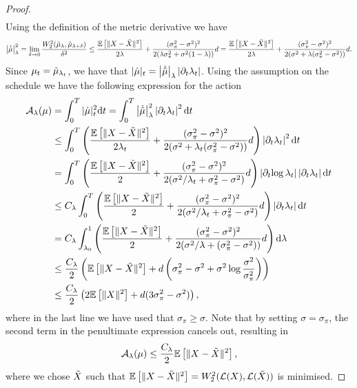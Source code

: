 \begin{proof}
\begin{align*}
\end{align*}
Using the definition of the metric derivative we have
\begin{equation*}
    \left\vert\Dot{\Tilde{\mu}}\right\vert_\lambda^2 = \lim_{\delta\to 0}\frac{ W_2^2(\Tilde{\mu}_\lambda, \Tilde{\mu}_{\lambda+\delta})}{\delta^2}\leq \frac{\mathbb{E}\left[\Vert X-\Tilde{X}\Vert^2\right]}{2 \lambda} + \frac{(\sigma_\pi^2-\sigma^2)^2}{2(\lambda\sigma_\pi^2 + \sigma^2(1-\lambda))}d = \frac{\mathbb{E}\left[\Vert X-\Tilde{X}\Vert^2\right]}{2 \lambda} + \frac{(\sigma_\pi^2-\sigma^2)^2}{2(\sigma^2 + \lambda(\sigma_{\pi}^2-\sigma^2))}d.
\end{equation*}
Since $\mu_t = \Tilde{\mu}_{\lambda_t}$, we have that $\vert\Dot{\mu}\vert_t = \left\vert\Dot{\Tilde{\mu}}\right\vert_\lambda\left\vert\partial_t{\lambda_t}\right\vert$. Using the assumption on the schedule we have the following expression for the action
\begin{align}
    \mathcal{A}_{\lambda}(\mu) &= \int_0^T \vert\Dot{\mu}\vert_t^2 \mathrm{d} t = \int_0^T \left\vert\Dot{\Tilde{\mu}}\right\vert_\lambda^2\left\vert\partial_t{\lambda_t}\right\vert^2 \mathrm{d} t\nonumber\\
    &\leq \int_0^T \left(\frac{\mathbb{E}\left[\Vert X-\Tilde{X}\Vert^2\right]}{2 \lambda_t} + \frac{(\sigma_\pi^2-\sigma^2)^2}{2(\sigma^2 + \lambda_t(\sigma_{\pi}^2-\sigma^2))}d\right)\left\vert \partial_t{\lambda_t}\right\vert^2\mathrm{d} t \nonumber\\
    &= \int_0^T \left(\frac{\mathbb{E}\left[\Vert X-\Tilde{X}\Vert^2\right]}{2} + \frac{(\sigma_\pi^2-\sigma^2)^2}{2(\sigma^2/\lambda_t + \sigma_{\pi}^2-\sigma^2)}d\right)\left\vert \partial_t{\log\lambda_t}\right\vert \left\vert \partial_t{\lambda_t}\right\vert\mathrm{d} t \nonumber\\    
    &\leq C_\lambda \int_0^T \left(\frac{\mathbb{E}\left[\Vert X-\Tilde{X}\Vert^2\right]}{2} +\frac{(\sigma_\pi^2-\sigma^2)^2}{2(\sigma^2/\lambda_t + \sigma_{\pi}^2-\sigma^2)}d\right) \left\vert \partial_t{\lambda_t}\right\vert\mathrm{d} t \nonumber\\ 
    &= C_\lambda \int_{\lambda_0}^{1} \left(\frac{\mathbb{E}\left[\Vert X-\Tilde{X}\Vert^2\right]}{2} + \frac{(\sigma_\pi^2-\sigma^2)^2}{2(\sigma^2/\lambda+(\sigma_\pi^2-\sigma^2))} d\right) \mathrm{d} \lambda \nonumber\\
    &\leq \frac{C_\lambda}{2} \left(\mathbb{E}\left[\Vert X-\Tilde{X}\Vert^2\right] + d\left(\sigma_\pi^2-\sigma^2 + \sigma^2\log\frac{\sigma^2}{\sigma_\pi^2}\right)\right)\nonumber\\ 
    &\leq \frac{C_\lambda}{2} \left(2\mathbb{E}\left[\Vert X\Vert^2\right] + d(3\sigma_\pi^2-\sigma^2)\right),\nonumber 
\end{align}
where in the last line we have used that $\sigma_\pi\geq\sigma$.
Note that by setting $\sigma=\sigma_\pi$, the second term in the penultimate expression cancels out, resulting in
\begin{equation*}
    \mathcal{A}_\lambda(\mu)\leq \frac{C_\lambda}{2}\mathbb{E}\left[\Vert X-\Tilde{X}\Vert^2\right],
\end{equation*}
where we chose $\Tilde{X}$ such that $\mathbb{E}\left[\Vert X-\Tilde{X}\Vert^2\right] = W_2^2(\mathcal{L}(X), \mathcal{L}(\tilde{X}))$ is minimised.


\end{proof}
